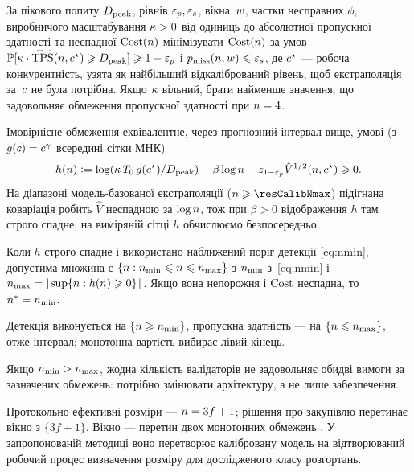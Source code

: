 \begin{Problem}
\label{prob:sizing}
За пікового попиту $D_{\mathrm{peak}}$, рівнів $\varepsilon_{p},\varepsilon_{s}$, вікна~$w$, частки несправних
$\phi$, виробничого масштабування $\kappa>0$ від одиниць \RNM{} до
абсолютної пропускної здатності та неспадної $\mathrm{Cost}(n)$ мінімізувати
$\mathrm{Cost}(n)$ за умов
$\mathbb{P}[\kappa\cdot\widetilde{\mathrm{TPS}}(n,c^{\star})\geqslant D_{\mathrm{peak}}]\geqslant1-\varepsilon_{p}$ і
$p_{\mathrm{miss}}(n,w)\leqslant\varepsilon_{s}$, де $c^{\star}$ --- робоча конкурентність, узята як
найбільший відкалібрований рівень, щоб екстраполяція за~$c$ не була потрібна.
Якщо $\kappa$
вільний, брати найменше значення, що задовольняє обмеження пропускної здатності
при $n=4$.
\end{Problem}

Імовірнісне обмеження еквівалентне, через прогнозний інтервал вище, умові
(з $g(c)=c^{\gamma}$ всередині сітки МНК)
\begin{equation}
h(\n)\eqdef\log(\kappaScale\,\Tzero\,\gfun(\cc^{\star})/\Dpk)
-\beta\log\n-\zq_{1-\epsp}\hat{V}^{1/2}(\n,\cc^{\star})\ge0.
\label{eq:h}
\end{equation}
На діапазоні модель-базованої екстраполяції ($\n\ge\resCalibNmax$) підігнана
коваріація робить $\hat{V}$ неспадною за $\log n$, тож при $\beta>0$
відображення $h$ там строго спадне; на виміряній сітці $h$ обчислюємо
безпосередньо.

\begin{Proposition}
\label{prop:window}
Коли $h$ строго спадне і використано наближений поріг детекції
\eqref{eq:nmin}, допустима множина є
$\{\n:\nmin\le\n\le\nmax\}$ з $\nmin$ з~\eqref{eq:nmin} і
$\nmax=\lfloor\sup\{\n:h(\n)\ge0\}\rfloor$. Якщо вона непорожня і $\mathrm{Cost}$
неспадна, то $\nopt=\nmin$.
\end{Proposition}

\begin{Proof}
Детекція виконується на $\{\n\ge\nmin\}$, пропускна здатність --- на
$\{\n\le\nmax\}$, отже інтервал; монотонна вартість вибирає лівий кінець.
\end{Proof}

\begin{Corollary}
\label{cor:infeasible}
Якщо $\nmin>\nmax$, жодна кількість валідаторів не задовольняє обидві вимоги за
зазначених обмежень: потрібно змінювати архітектуру, а не лише забезпечення.
\end{Corollary}

Протокольно ефективні розміри --- $n=3f+1$; рішення про закупівлю перетинає
вікно з $\{3f+1\}$. Вікно ---
перетин двох монотонних обмежень
\cite{charnes1959,nemirovski2007}. У запропонованій методиці воно перетворює
калібровану модель на відтворюваний робочий процес визначення розміру для
дослідженого класу розгортань.

